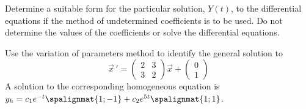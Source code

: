 \documentclass[12pt]{exam}
\begin{document}
\begin{questions}
    
    
    
    

    \newpage \InitialsLeft
    \question[7]  Determine a suitable form for the particular solution, $Y(t)$, to the differential equations if the method of undetermined coefficients is to be used. Do not determine the values of the coefficients or solve the differential equations. 
    


    \newpage \InitialsRight
    \question[8] Use the variation of parameters method to identify the general solution to \[\vec{x} \, ' = \left( \begin{array}{rr} 2 & 3 \\ 3 & 2 \end{array} \right) \vec{x}  + \left( \begin{array}{r}  0\\ 1\end{array} \right)  \]
    A solution to the corresponding homogeneous equation is $y_h = c_1e^{-t}\spalignmat{1;-1}+c_2e^{5t}\spalignmat{1;1}$.
    
    
\end{questions}


\newpage \InitialsRight \LastPage 

\newpage \InitialsRight \LastPage 
\end{document}
